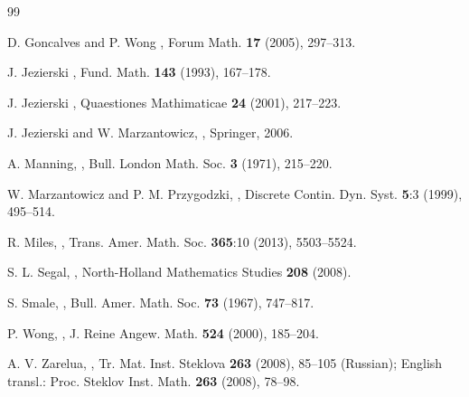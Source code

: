 \documentclass[oneside]{amsart}
\begin{document}
\begin{thebibliography}{99}

{\sc  D. Goncalves and P. Wong}
,
\newblock Forum Math. {\bf 17}  (2005), 297--313.

{\sc J. Jezierski}
,
\newblock Fund. Math. {\bf 143}  (1993), 167--178.

{\sc J. Jezierski}
,
\newblock Quaestiones Mathimaticae {\bf 24}  (2001), 217--223.

{\sc J. Jezierski and W. Marzantowicz},
,
\newblock Springer, 2006.


{\sc A. Manning},
,
\newblock Bull. London Math. Soc. {\bf 3} (1971), 215--220.

{\sc W. Marzantowicz and P. M. Przygodzki},
,
\newblock Discrete Contin. Dyn. Syst. {\bf 5}:3 (1999), 495--514.

{\sc R. Miles},
,
\newblock Trans. Amer. Math. Soc. {\bf 365}:10 (2013), 5503--5524.

{\sc S. L. Segal},
,
\newblock North-Holland Mathematics Studies \textbf{208} (2008).

{\sc S. Smale},
,
\newblock Bull. Amer. Math. Soc. {\bf 73} (1967), 747--817.

{\sc P. Wong},
,
\newblock J. Reine Angew. Math. {\bf 524} (2000), 185--204.

{\sc A. V. Zarelua},
,
\newblock Tr. Mat. Inst. Steklova {\bf 263} (2008), 85--105 (Russian);
English transl.: Proc. Steklov Inst. Math. {\bf 263} (2008), 78--98.

\end{thebibliography}
\end{document}
